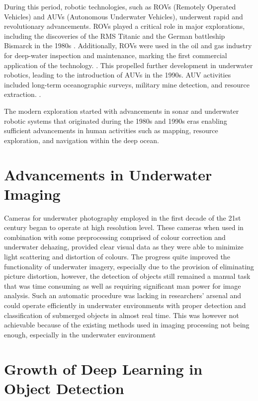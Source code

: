 During this period, robotic technologies, such as ROVs (Remotely Operated Vehicles) and AUVs (Autonomous Underwater Vehicles), underwent rapid and revolutionary advancements. ROVs played a critical role in major explorations, including the discoveries of the RMS Titanic and the German battleship Bismarck in the 1980s \cite{droneblog_rov_history}. Additionally, ROVs were used in the oil and gas industry for deep-water inspection and maintenance, marking the first commercial application of the technology. \cite{hayesparsons_rovs}. This propelled further development in underwater robotics, leading to the introduction of AUVs in the 1990s. AUV activities included long-term oceanographic surveys, military mine detection, and resource extraction. \cite{thedroneu_auvs}.

The modern exploration started with advancements in sonar and underwater robotic systems that originated during the 1980s and 1990s eras enabling sufficient advancements in human activities such as mapping, resource exploration, and navigation within the deep ocean.

\section{Advancements in Underwater Imaging}

Cameras for underwater photography employed in the first decade of the 21st century began to operate at high resolution level. These cameras when used in combination with some preprocessing comprised of colour correction and underwater dehazing, provided clear visual data as they were able to minimize light scattering and distortion of colours. The progress quite improved the functionality of underwater imagery, especially due to the provision of eliminating picture distortion, however, the detection of objects still remained a manual task that was time consuming as well as requiring significant man power for image analysis. Such an automatic procedure was lacking in researchers’ arsenal and could operate efficiently in underwater environments with proper detection and classification of submerged objects in almost real time. This was however not achievable because of the existing methods used in imaging processing not being enough, especially in the underwater environment \cite{ancuti2018color}



\section{Growth of Deep Learning in Object Detection}

